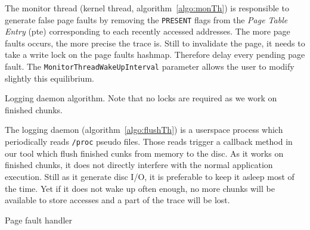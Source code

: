 The monitor thread (kernel thread, algorithm~\ref{algo:monTh}) is
responsible to generate false page faults by removing the \texttt{PRESENT}
flags from the \emph{Page Table Entry} (pte) corresponding to each recently
accessed addresses. The more page faults occurs, the more
precise the trace is. Still to invalidate the page, it needs
to take a write lock on the page faults hashmap. Therefore
delay every pending page fault. The
\texttt{MonitorThreadWakeUpInterval} parameter allows the user
to modify slightly this equilibrium.

\begin{algorithm}[htb]
    \caption{Logging daemon algorithm. Note that no locks are required as we
    work on finished chunks.}
    \label{algo:flushTh}
    \begin{algorithmic}[1]
                \State {}
                \State {}
                \EndFor
            \EndFor
            \State {}
        \EndWhile
    \end{algorithmic}
\end{algorithm}

The logging daemon (algorithm~\ref{algo:flushTh}) is a userspace process
which periodically reads \texttt{/proc} pseudo files. Those reads trigger a
callback method in our tool which flush finished cunks from memory to the
disc. As it works on finished chunks, it does not directly interfere with the
normal application execution. Still as it generate disc I/O, it is preferable to
keep it asleep most of the time. Yet if it does not wake up often enough, no
more chunks will be available to store accesses and a part of the trace will
be lost.

\begin{algorithm}[htb]
    \caption{Page fault handler}
    \label{algo:PageFault}
    \begin{algorithmic}[1]
                    \State \Return {}
                \EndIf
            \EndIf
            \State {}
            \State {}
            \State {}
            \State {}
            \State {}
            \State {}
        \EndFunction
    \end{algorithmic}
\end{algorithm}

